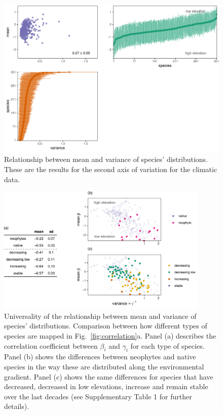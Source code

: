 \documentclass[11pt, a4paper]{article}
\begin{document}
\clearpage

\begin{figure}[h]
  \centering
    \vspace{0.5cm}
    \includegraphics[width=1\textwidth]{figures/figure1-secondaxis}
    	  \vspace{0.3cm}
	   \caption{Relationship between mean and variance of species' distributions. These are the results for the second axis of variation for the climatic data.}
      \label{sfig:sensitivity}
\end{figure}

\begin{figure}[ht]
  \centering
    \includegraphics[width=0.9\textwidth]{figures/means-Rapopor}
    	  \vspace{0.1cm}
	   \caption{Universality of the relationship between mean and variance of species' distributions. Comparison between how different types of species are mapped in Fig.~\ref{fig:correlation}a. Panel (a) describes the correlation coefficient between $\beta_i$ and $\gamma_i$ for each type of species. Panel (b) shows the differences between neophytes and native species in the way these are distributed along the environmental gradient. Panel (c) shows the same differences for species that have decreased, decreased in low elevations, increase and remain stable over the last decades (see Supplementary Table 1 for further details).}
      \label{sfig:universality}
\end{figure}

\clearpage


\end{document}
